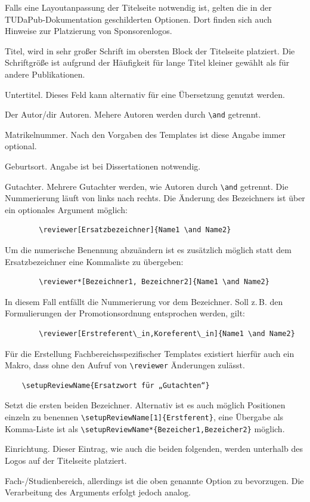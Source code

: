 Falls eine Layoutanpassung der Titelseite notwendig ist, gelten die in der TUDaPub-Dokumentation geschilderten Optionen. Dort finden sich auch Hinweise zur Platzierung von Sponsorenlogos. \cite{tudapub}

\begin{description}
	\item[title] Titel, wird in sehr großer Schrift im obersten Block der Titelseite platziert. Die Schriftgröße ist aufgrund der Häufigkeit für lange Titel kleiner gewählt als für andere Publikationen.
	\item[subtitle] Untertitel. Dieses Feld kann alternativ für eine Übersetzung genutzt werden.
	\item[author] Der Autor/dir Autoren. Mehere Autoren werden durch \verb+\and+ getrennt.
	\item[studentID] Matrikelnummer. Nach den Vorgaben des Templates ist diese Angabe immer optional.
	\item[birthplace] Geburtsort. Angabe ist bei Dissertationen notwendig.
	\item[reviewer] Gutachter. Mehrere Gutachter werden, wie Autoren durch \verb+\and+ getrennt. Die Nummerierung läuft von links nach rechts.
	Die Änderung des Bezeichners ist über ein optionales Argument möglich:
	\begin{verbatim}
		\reviewer[Ersatzbezeichner]{Name1 \and Name2}
	\end{verbatim}
	Um die numerische Benennung abzuändern ist es zusätzlich möglich statt dem Ersatzbezeichner eine Kommaliste zu übergeben:
	\begin{verbatim}
		\reviewer*[Bezeichner1, Bezeichner2]{Name1 \and Name2}
	\end{verbatim}
	In diesem Fall entfällt die Nummerierung vor dem Bezeichner. Soll z.\,B. den Formulierungen der Promotionsordnung entsprochen werden, gilt:
	\begin{verbatim}
		\reviewer[Erstreferent\_in,Koreferent\_in]{Name1 \and Name2}
	\end{verbatim}
	Für die Erstellung Fachbereichsspezifischer Templates existiert hierfür auch ein Makro, dass ohne den Aufruf von \verb+\reviewer+ Änderungen zulässt.
	\begin{verbatim}
	\setupReviewName{Ersatzwort für „Gutachten“}
	\end{verbatim}
	Setzt die ersten beiden Bezeichner. Alternativ ist es auch möglich Positionen einzeln zu benennen \verb+\setupReviewName[1]{Erstferent}+, eine Übergabe als Komma-Liste ist als \verb+\setupReviewName*{Bezeicher1,Bezeicher2}+ möglich.
	\item[institution] Einrichtung. Dieser Eintrag, wie auch die beiden folgenden, werden unterhalb des Logos auf der Titelseite platziert.
	\item[department] Fach-/Studienbereich, allerdings ist die oben genannte Option zu bevorzugen. Die Verarbeitung des Arguments erfolgt jedoch analog.


\end{description}
